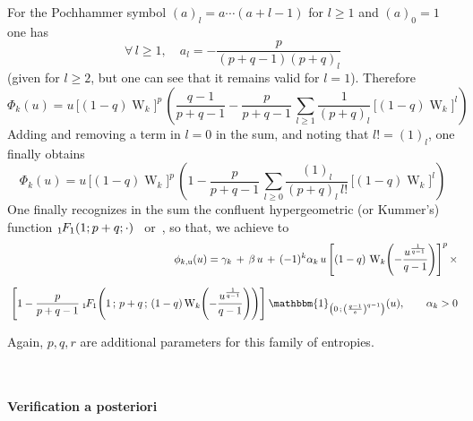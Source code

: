 \documentclass[entropy,article,submit,moreauthors,pdftex]{Definitions/mdpi}
\def\un{\mathbbm{1}}%
\def\W{\operatorname{W}} %
\newcommand{\hypgeom}[2]{\mbox{}_{#1}\hspace{-1pt}F_{#2}}%
\def\u{\mathrm{u}}
\begin{document}
%
For the Pochhammer symbol $(a)_l = a \cdots (a+l-1)$ for $l \ge 1$ and $(a)_0 = 1$ one has 
%
\[
\forall \, l \ge 1, \quad a_l = - \frac{p}{(p+q-1) (p+q)_l}
\]
%
(given for $l \ge 2$, but one can see that it remains valid for $l = 1$). Therefore
%
\[
\Phi_k(u)  =  u  \,  \Big[  (1-q)  \W_k  \Big]^p  \,  \left(  \frac{q-1}{p+q-1}  -
\frac{p}{p+q-1} \, \sum_{l \ge 1}  \frac{1}{(p+q)_l} \, \Big[ (1-q) \W_k \Big]^l
\right)
\]
%
Adding and removing a term in $l = 0$  in the sum, and noting that $l! = (1)_l$,
one finally obtains
%
\[
\Phi_k(u) = u \, \Big[ (1-q) \W_k \Big]^p \, \left( 1 - \frac{p}{p+q-1} \, \sum_{l
  \ge 0} \frac{(1)_l}{(p+q)_l \, l!} \, \Big[ (1-q) \W_k \Big]^l \right)
\]
%
One finally  recognizes in  the sum the  confluent hypergeometric  (or Kummer's)
function    $\hypgeom{1}{1}(1    ;    p+q    ;    \cdot)$~\cite[\S~13]{AbrSte70}
or~\cite[\S~9.2]{GraRyz15}, so that, we achieve to
%
\begin{eqnarray}
&&\phi_{k,\u}(u) =  \gamma_k \, + \, \beta \, u \, + \, (-1)^k \alpha_k \, u \,
  \left[ (1-q) \, \W_k\left( - \frac{u^{\frac{1}{q-1}}}{q-1} \right) \right]^p
  \, \times\nonumber
\\[2.5mm]
&&\hspace{-2.5mm}\left[ 1 - \frac{p}{p+q-1} \: \hypgeom{1}{1}\left( 1 \, ; \,
  p+q \, ; \, (1-q) \W_k \left( - \frac{u^{\frac{1}{q-1}}}{q-1} \right) \right)
  \right] \: \un_{\left( 0 \, ; \, \left( \frac{q-1}{e} \right)^{q-1}
  \right)}(u), \qquad  \alpha_k > 0
\end{eqnarray}

Again, $p, q, r$ are additional parameters for this family of entropies.


\

\paragraph{\bf Verification a posteriori}
\end{document}
